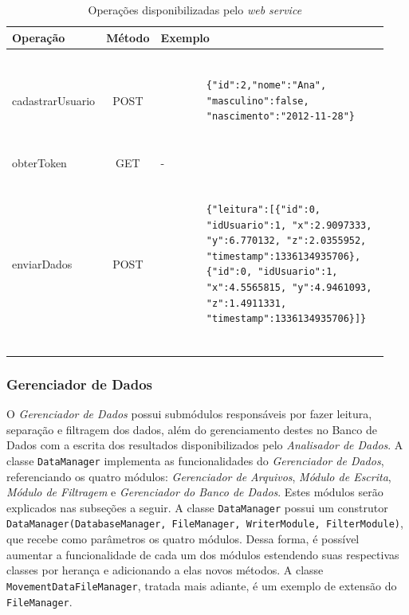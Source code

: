 \begin{table} 
\centering 
\caption{Operações disponibilizadas pelo \textit{web service}}
\begin{center}
    \begin{tabular}{ | l | c | l | }
        \hline
        Operação & Método & Exemplo \\ \hline
        cadastrarUsuario & POST & 
		\begin{minipage}{7cm}\begin{verbatim}
		
		{"id":2,"nome":"Ana",
		"masculino":false,
		"nascimento":"2012-11-28"}
		
		\end{verbatim}\end{minipage} \\ \hline
        obterToken & GET & - \\ \hline
        enviarDados & POST & 
		\begin{minipage}{7.5cm}\begin{verbatim}

		{"leitura":[{"id":0, 
		"idUsuario":1, "x":2.9097333, 
		"y":6.770132, "z":2.0355952, 
		"timestamp":1336134935706}, 
		{"id":0, "idUsuario":1, 
		"x":4.5565815, "y":4.9461093, 
		"z":1.4911331, 
		"timestamp":1336134935706}]}
		
		\end{verbatim}\end{minipage} \\ \hline
    \end{tabular}
\end{center}
\label{tab:operations}
\end{table}

\subsubsection{Gerenciador de Dados}
O \emph{Gerenciador de Dados} possui submódulos responsáveis por fazer leitura, separação e filtragem dos dados, além do gerenciamento destes no Banco de Dados com a escrita dos resultados disponibilizados pelo \emph{Analisador de Dados}. A classe \texttt{DataManager} implementa as funcionalidades do \emph{Gerenciador de Dados}, referenciando os quatro módulos: \emph{Gerenciador de Arquivos}, \emph{Módulo de Escrita}, \emph{Módulo de Filtragem} e \emph{Gerenciador do Banco de Dados}. Estes módulos serão explicados nas subseções a seguir. A classe \texttt{DataManager} possui um construtor \texttt{DataManager(DatabaseManager, FileManager, WriterModule, FilterModule)}, que recebe como parâmetros os quatro módulos. Dessa forma, é possível aumentar a funcionalidade de cada um dos módulos estendendo suas respectivas classes por herança e adicionando a elas novos métodos. A classe \texttt{MovementDataFileManager}, tratada mais adiante, é um exemplo de extensão do \texttt{FileManager}.

